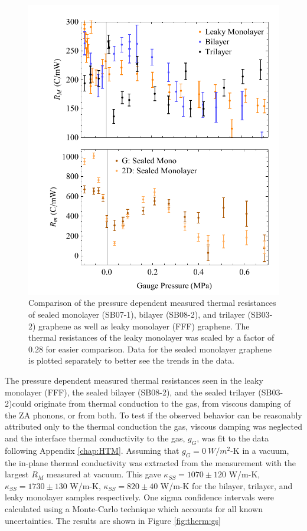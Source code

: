 \begin{figure}
	\begin{center}
	\includegraphics{Figs_Thermal/Rs.pdf}
	\end{center}
	\caption[Pressure dependent measured thermal resistances of mono-, bi-, and trilayer graphene]{\label{fig:therm:Rs}
		Comparison of the pressure dependent measured thermal resistances of sealed monolayer (SB07-1), bilayer (SB08-2), and trilayer (SB03-2) graphene as well as leaky monolayer (FFF) graphene.
		The thermal resistances of the leaky monolayer was scaled by a factor of 0.28 for easier comparison.
		Data for the sealed monolayer graphene is plotted separately to better see the trends in the data.
	}
\end{figure}

The pressure dependent measured thermal resistances seen in the leaky monolayer (FFF), the sealed bilayer (SB08-2), and the sealed trilayer (SB03-2)could originate from thermal conduction to the gas, from viscous damping of the ZA phonons, or from both.
To test if the observed behavior can be reasonably attributed only to the thermal conduction the gas, viscous damping was neglected and the interface thermal conductivity to the gas, $g_G$, was fit to the data following Appendix \ref{chap:HTM}.
Assuming that $g_G=0 \ W/m^2$-K in a vacuum, the in-plane thermal conductivity was extracted from the measurement with the largest $R_M$ measured at vacuum.
This gave $\kappa_{SS}=1070 \pm 120$ W/m-K, $\kappa_{SS}=1730 \pm 130$ W/m-K, $\kappa_{SS}= 820 \pm 40$ W/m-K for the bilayer, trilayer, and leaky monolayer samples respectively. 
One sigma confidence intervals were calculated using a Monte-Carlo technique which accounts for all known uncertainties.
The results are shown in Figure \ref{fig:therm:gs}

